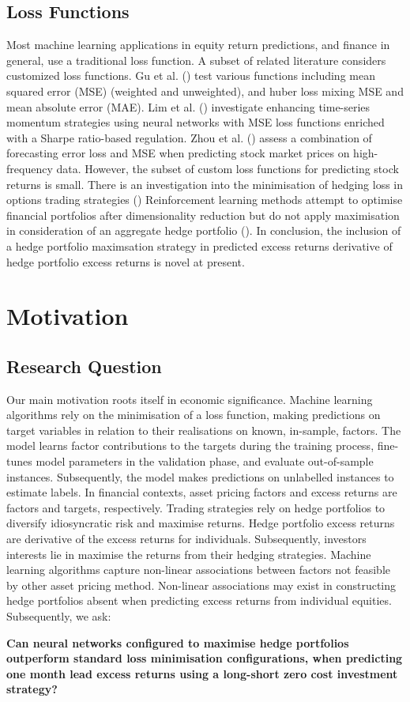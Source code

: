 \documentclass[12pt]{article}
\begin{document}
\subsection{Loss Functions}
Most machine learning applications in equity return predictions, and finance in general, use a traditional loss function.
A subset of related literature considers customized loss functions.
Gu et al. (\citeyear{eapvml}) test various functions including mean squared error (MSE) (weighted and unweighted), and huber loss mixing MSE and mean absolute error (MAE).
Lim et al. (\citeyear{lim2019enhancing}) investigate enhancing time-series momentum strategies using neural networks with MSE loss functions enriched with a Sharpe ratio-based regulation.
Zhou et al. (\citeyear{zhou2018stock}) assess a combination of forecasting error loss and MSE when predicting stock market prices on high-frequency data.
However, the subset of custom loss functions for predicting stock returns is small.
There is an investigation into the minimisation of hedging loss in options trading strategies (\cite{ruf2021hedging})
Reinforcement learning methods attempt to optimise financial portfolios after dimensionality reduction but do not apply maximisation in consideration of an aggregate hedge portfolio (\cite{soleymani2020financial}).
In conclusion, the inclusion of a hedge portfolio maximsation strategy in predicted excess returns derivative of hedge portfolio excess returns is novel at present.
\newpage
\section{Motivation}
\subsection{Research Question}
Our main motivation roots itself in economic significance.
Machine learning algorithms rely on the minimisation of a loss function, making predictions on target variables in relation to their realisations on known, in-sample, factors. 
The model learns factor contributions to the targets during the training process, fine-tunes model parameters in the validation phase, and evaluate out-of-sample instances.
Subsequently, the model makes predictions on unlabelled instances to estimate labels.
In financial contexts, asset pricing factors and excess returns are factors and targets, respectively.
Trading strategies rely on hedge portfolios to diversify idiosyncratic risk and maximise returns.
Hedge portfolio excess returns are derivative of the excess returns for individuals.
Subsequently, investors interests lie in maximise the returns from their hedging strategies.
Machine learning algorithms capture non-linear associations between factors not feasible by other asset pricing method.
Non-linear associations may exist in constructing hedge portfolios absent when predicting excess returns from individual equities.
Subsequently, we ask:
\begin{center}
	\textbf{Can neural networks configured to maximise hedge portfolios outperform standard loss minimisation configurations,
	when predicting one month lead excess returns using a long-short zero cost investment strategy?}
\end{center}
\end{document}
